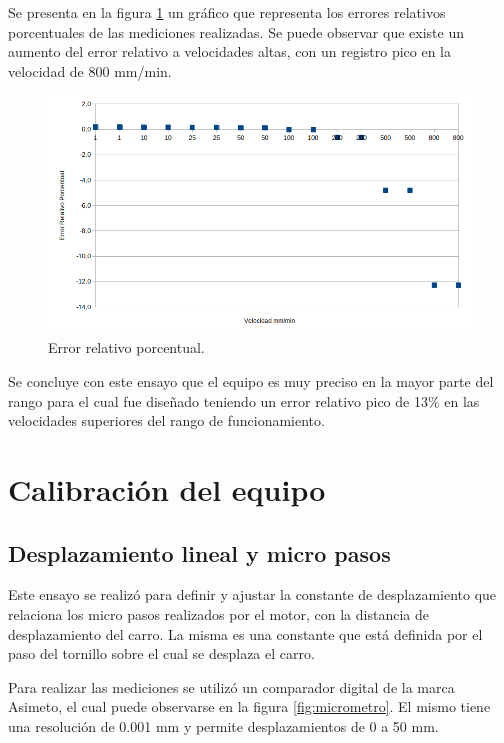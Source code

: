 Se presenta en la figura \ref{fig:error_porcentual_1} un gráfico que representa los errores relativos porcentuales de las mediciones realizadas. Se puede observar que existe un aumento del error relativo a velocidades altas, con un registro pico  en la velocidad de 800 mm/min. 


\begin{figure}[h]
\centering 
\includegraphics[width=1\textwidth]{./Figures/error.png}
\caption{Error relativo porcentual.}
\label{fig:error_porcentual_1}
\end{figure}
Se concluye con este ensayo que el equipo es muy preciso en la mayor parte del rango para el cual fue diseñado teniendo un error relativo pico de 13\% en las velocidades superiores del rango de funcionamiento.
 
  
\section{Calibración del equipo}
\label{sec:calibración}
\subsection{Desplazamiento lineal y micro pasos}

Este ensayo se realizó para definir y ajustar la constante de desplazamiento que relaciona los micro pasos realizados por el motor, con la distancia de desplazamiento del carro. La misma es una constante que está definida por el paso del tornillo sobre el cual se desplaza el carro.

Para realizar las mediciones se utilizó un comparador digital de la marca Asimeto\citep{web_asimeto}, el cual puede observarse en la figura \ref{fig:micrometro}. El mismo tiene una resolución de 0.001 mm y permite desplazamientos de 0 a 50 mm.



